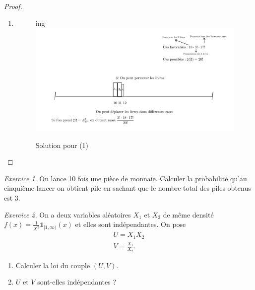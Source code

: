 \documentclass[french]{book}
\theoremstyle{definition}
\theoremstyle{remark}
\newtheorem{exo}{Exercice}
\begin{document}
\begin{proof}

  \

  \begin{enumerate}
    \item

    \begin{figure}[h!]
      \center{}ing
      \includegraphics[scale=0.3]{figures/exo_livres.png}
      \caption{Solution pour (1)}
      \label{}
    \end{figure}

  \end{enumerate}
\end{proof}

\begin{exo}
  On lance 10 fois une pièce de monnaie. Calculer la probabilité qu'au cinquième lancer on obtient pile en sachant que le nombre total des piles obtenus est 3.
\end{exo}

\begin{exo}
  On a deux variables aléatoires \(X_1\) et \(X_2\) de même densité \(f(x) = \frac{1}{X ^2} \mathds{1}_{[1, \infty)}(x)\) et elles sont indépendantes. On pose
  \begin{gather*}
    U = X_1 X_2 \\
    V = \frac{X_1}{X_2}.
  \end{gather*}

  \begin{enumerate}
    \item Calculer la loi du couple \((U,V)\).
    \item \(U \text{ et } V \) sont-elles indépendantes ?
  \end{enumerate}
\end{exo}
\end{document}
